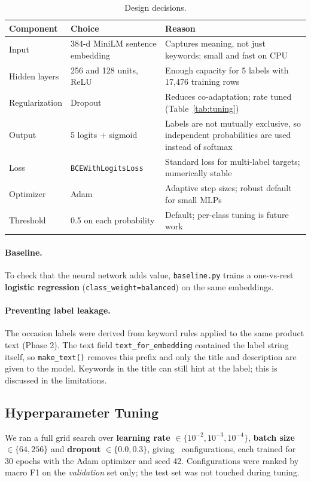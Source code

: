 \begin{table}[htbp]
\centering
\small
\begin{tabular}{p{2.4cm}p{4.2cm}p{8.2cm}}
\toprule
Component & Choice & Reason \\
\midrule
Input & 384-d MiniLM sentence embedding & Captures meaning, not just keywords; small and fast on CPU \\
Hidden layers & 256 and 128 units, ReLU & Enough capacity for 5 labels with 17,476 training rows \\
Regularization & Dropout & Reduces co-adaptation; rate tuned (Table~\ref{tab:tuning}) \\
Output & 5 logits + sigmoid & Labels are not mutually exclusive, so independent probabilities are used instead of softmax \\
Loss & \texttt{BCEWithLogitsLoss} & Standard loss for multi-label targets; numerically stable \\
Optimizer & Adam & Adaptive step sizes; robust default for small MLPs \\
Threshold & 0.5 on each probability & Default; per-class tuning is future work \\
\bottomrule
\end{tabular}
\caption{Design decisions.}
\end{table}

\paragraph{Baseline.} To check that the neural network adds value, \texttt{baseline.py} trains a one-vs-rest \textbf{logistic regression} (\texttt{class\_weight=balanced}) on the same embeddings.

\paragraph{Preventing label leakage.} The occasion labels were derived from keyword rules applied to the same product text (Phase 2). The text field \texttt{text\_for\_embedding} contained the label string itself, so \texttt{make\_text()} removes this prefix and only the title and description are given to the model. Keywords in the title can still hint at the label; this is discussed in the limitations.

\subsection{Hyperparameter Tuning}
We ran a full grid search over \textbf{learning rate} $\in\{10^{-2},10^{-3},10^{-4}\}$, \textbf{batch size} $\in\{64,256\}$ and \textbf{dropout} $\in\{0.0,0.3\}$, giving \nConfigs\ configurations, each trained for 30 epochs with the Adam optimizer and seed 42. Configurations were ranked by macro F1 on the \emph{validation} set only; the test set was not touched during tuning.

